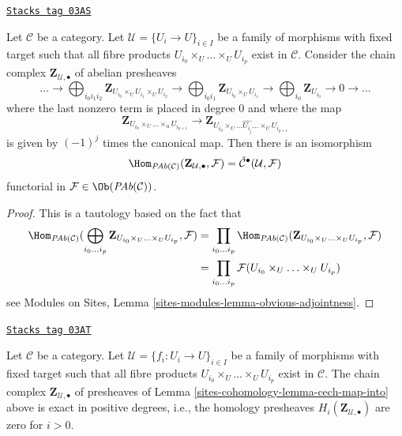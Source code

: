 \begin{lemma}
\label{sites-cohomology-lemma-cech-map-into}
\href{https://stacks.math.columbia.edu/tag/03AS}{\texttt{Stacks tag 03AS}}

Let $\mathcal{C}$ be a category. Let $\mathcal{U} = \{U_i \to U\}_{i \in I}$
be a family of morphisms with fixed target such that all fibre products
$U_{i_0} \times_U \ldots \times_U U_{i_p}$ exist in $\mathcal{C}$.
Consider the chain complex $\mathbf{Z}_{\mathcal{U}, \bullet}$
of abelian presheaves
$$
\ldots
\to
\bigoplus_{i_0i_1i_2} \mathbf{Z}_{U_{i_0} \times_U U_{i_1} \times_U U_{i_2}}
\to
\bigoplus_{i_0i_1} \mathbf{Z}_{U_{i_0} \times_U U_{i_1}}
\to
\bigoplus_{i_0} \mathbf{Z}_{U_{i_0}}
\to 0 \to \ldots
$$
where the last nonzero term is placed in degree $0$
and where the map
$$
\mathbf{Z}_{U_{i_0} \times_U \ldots \times_u U_{i_{p + 1}}}
\longrightarrow
\mathbf{Z}_{U_{i_0} \times_U
\ldots \widehat{U_{i_j}} \ldots \times_U U_{i_{p + 1}}}
$$
is given by $(-1)^j$ times the canonical map.
Then there is an isomorphism
$$
\Hom_{\textit{PAb}(\mathcal{C})}(\mathbf{Z}_{\mathcal{U}, \bullet}, \mathcal{F})
=
\check{\mathcal{C}}^\bullet(\mathcal{U}, \mathcal{F})
$$
functorial in $\mathcal{F} \in \Ob(\textit{PAb}(\mathcal{C}))$.
\end{lemma}

\begin{proof}
This is a tautology based on the fact that
\begin{align*}
\Hom_{\textit{PAb}(\mathcal{C})}(
\bigoplus_{i_0 \ldots i_p}
\mathbf{Z}_{U_{i_0} \times_U \ldots \times_U U_{i_p}},
\mathcal{F})
& =
\prod_{i_0 \ldots i_p}
\Hom_{\textit{PAb}(\mathcal{C})}(
\mathbf{Z}_{U_{i_0} \times_U \ldots \times_U U_{i_p}},
\mathcal{F}) \\
& =
\prod_{i_0 \ldots i_p}
\mathcal{F}(U_{i_0} \times_U \ldots \times_U U_{i_p})
\end{align*}
see Modules on Sites, Lemma \ref{sites-modules-lemma-obvious-adjointness}.
\end{proof}

\begin{lemma}
\label{sites-cohomology-lemma-homology-complex}
\href{https://stacks.math.columbia.edu/tag/03AT}{\texttt{Stacks tag 03AT}}

Let $\mathcal{C}$ be a category. Let
$\mathcal{U} = \{f_i : U_i \to U\}_{i \in I}$ be a family of morphisms
with fixed target such that all fibre products
$U_{i_0} \times_U \ldots \times_U U_{i_p}$ exist in $\mathcal{C}$.
The chain complex $\mathbf{Z}_{\mathcal{U}, \bullet}$ of presheaves
of Lemma \ref{sites-cohomology-lemma-cech-map-into} above is exact in positive
degrees, i.e., the homology presheaves
$H_i(\mathbf{Z}_{\mathcal{U}, \bullet})$ are zero for $i > 0$.
\end{lemma}

